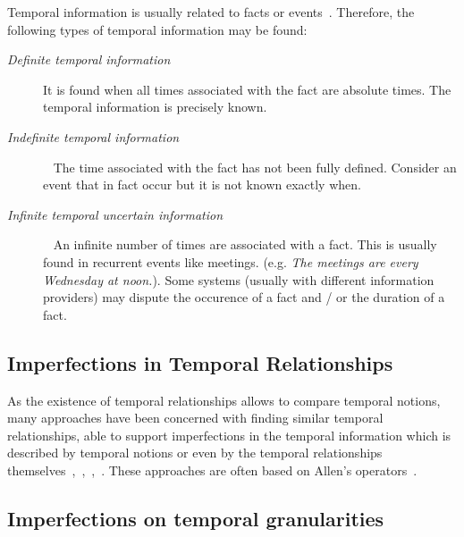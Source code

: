 Temporal information is usually related to facts or events~\cite{Chountas2000}. Therefore, the following types of temporal information may be found:

\begin{description}
\item[\emph{Definite temporal information}]
It is found when all times associated with the fact are absolute times. The temporal information is precisely known.

\item[\emph{Indefinite temporal information}]~\cite{Dey1996}
The time associated with the fact has not been fully defined. Consider an event that in fact occur but it is not known exactly when.

\item[\emph{Infinite temporal uncertain information}]~\cite{Kabanza1990}
An infinite number of times are associated with a fact. This is usually found in recurrent events like meetings. (e.g. \emph{The meetings are every Wednesday at noon.}). Some systems (usually with different information providers) may dispute the occurence of a fact and / or the duration of a fact. 
\end{description}


\subsection{Imperfections in Temporal Relationships}
As the existence of temporal relationships allows to compare temporal notions, many approaches have been concerned with finding similar temporal relationships, able to support imperfections in the temporal information which is described by temporal notions or even by the temporal relationships themselves~\cite{ohlbach2004},~\cite{nagypal2003},~\cite{schockaert08},~\cite{Dubois:jucs_9_9:fuzziness_and_uncertainty_in}. These approaches are often based on Allen's operators~\cite{Allen83}.


\subsection{\label{subsec:temporal-granularities}Imperfections on temporal granularities}



%
%
